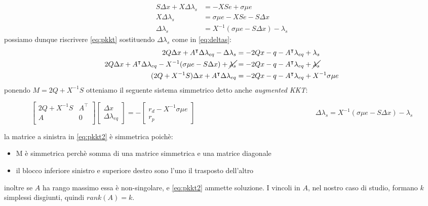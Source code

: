 \begin{equation} \label{eq:deltas}
\begin{split}
    S\Delta x + X \Delta \lambda_s &= -XSe + \sigma \mu e\\
    X \Delta \lambda_s &=\sigma \mu e -XSe -S\Delta x\\
    \Delta \lambda_s &= X^{-1}(\sigma \mu e - S\Delta x) - \lambda_s
\end{split}
\end{equation}
possiamo dunque riscrivere \ref{eq:pkkt} sostituendo $\Delta \lambda_s$ come in \ref{eq:deltas}:
\begin{equation}\label{eq:deltax}
    \begin{split}
        2Q\Delta x + A^\intercal \Delta \lambda_{eq} - \Delta \lambda_s &= -2Qx-q-A^\intercal \lambda_{eq} +\lambda_s\\
        2Q\Delta x + A^\intercal \Delta \lambda_{eq} - X^{-1}(\sigma \mu e - S\Delta x) + \cancel{\lambda_s} &= -2Qx-q-A^\intercal \lambda_{eq} + \cancel{\lambda_s}\\
        (2Q +X^{-1}S)\Delta x + A^\intercal \Delta \lambda_{eq} &= -2Qx -q -A^\intercal \lambda_{eq} + X^{-1} \sigma \mu e
    \end{split}
\end{equation}
ponendo $M=2Q + X^{-1}S$ otteniamo il seguente sistema simmetrico detto anche \emph{augmented KKT}:

\begin{subequations}\label{eq:aguKKT}
\begin{equation} \label{eq:pkkt2}
\begin{bmatrix}
2Q +X^{-1}S & A^\intercal\\
A & 0 \\
\end{bmatrix}\begin{bmatrix}\Delta x \\ \Delta \lambda_{eq}\end{bmatrix}= -
\begin{bmatrix}
    r_d-X^{-1}\sigma \mu e\\r_p
\end{bmatrix}
\end{equation}
\begin{equation} \label{eq:dds}
\;\;\;\;\;\;\;\;\;\;\;\;\;\;\;\;\;\;\;\;\;\;\;\;\;\;\;\;\;\;\;\;\;\;\;\;\;\;\;\;\;\;\;\;\;\;\;\;\;\;\;\;\;\;\;\;\;\;\;\;\;\Delta \lambda_s = X^{-1}(\sigma \mu e - S\Delta x) - \lambda_s
\end{equation}
\end{subequations}

la matrice a sinistra in \ref{eq:pkkt2} è simmetrica poichè:
\begin{itemize}
    \item M è simmetrica perchè somma di una matrice simmetrica e una matrice diagonale
    \item il blocco inferiore sinistro e superiore destro sono l'uno il trasposto dell'altro
\end{itemize}
inoltre se $A$ ha rango massimo essa è non-singolare, e \ref{eq:pkkt2} ammette soluzione. I vincoli in $A$, nel nostro caso di studio, formano $k$ simplessi disgiunti, quindi $rank(A)=k$.

